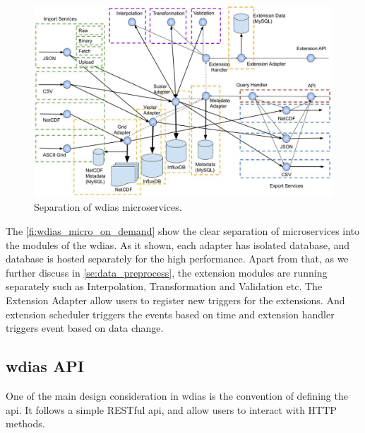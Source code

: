 \begin{figure}[htp]
    \centering
    \includegraphics[width=1\textwidth]{method/microservice/separation_microservices-v3.jpg}
    \caption{Separation of \acrshort{wdias} microservices.}
    \label{fi:wdias_micro_separation}
\end{figure}
The \cref{fi:wdias_micro_on_demand} show the clear separation of microservices into the modules of the \acrshort{wdias}. As it shown, each adapter has isolated database, and database is hosted separately for the high performance.
Apart from that, as we further discuss in \cref{se:data_preprocess}, the extension modules are running separately such as Interpolation, Transformation and Validation etc.
The Extension Adapter allow users to register new triggers for the extensions. And extension scheduler triggers the events based on time and extension handler triggers event based on data change.


\subsection{\acrshort{wdias} API}
\label{sebse:wdias_api}
One of the main design consideration in \acrshort{wdias} is the convention of defining the \acrshort{api}. It follows a simple RESTful \acrshort{api}, and allow users to interact with HTTP methods.

